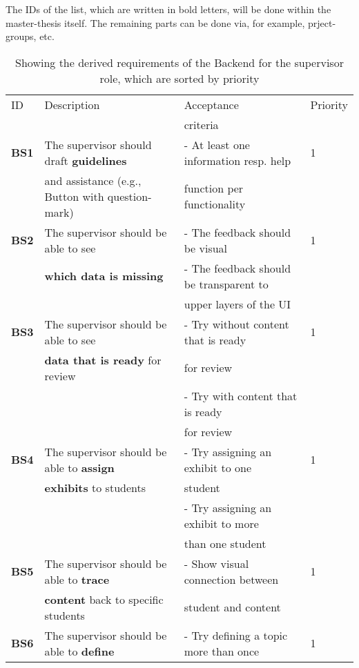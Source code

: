 \documentclass[twoside,openright,fleqn,pointlessnumbers,headinclude,,11pt,a4paper,BCOR5mm,footinclude,cleardoubleempty,abstracton %
                ]{scrreprt}
\begin{document}
The IDs of the list, which are written in bold letters, will be done within the master-thesis itself. The remaining parts can be done via, for example,
prject-groups, etc. 

	\begin{table}[h]
		\caption{Showing the derived requirements of the Backend for the supervisor role, which are sorted by priority}
	\begin{tabular}{llll}
	\hline
	ID 	& Description 	& Acceptance 	& Priority \\
	 	& 			 & criteria 	&  \\
		\hline
	\textbf{BS1} 	& The supervisor should draft \textbf{guidelines} 		& - At least one information resp. help 	& 1	\\
	 		& and assistance (e.g., Button with question-mark)		& function per functionality 			& 		\\
	\hline
	\textbf{BS2} 	& The supervisor should be able to see 				&  - The feedback should be visual	& 1	\\
	 	& \textbf{which data is missing} 					&  - The feedback should be transparent to	& 	\\
		& 											& upper layers of the UI & \\
	\hline
	\textbf{BS3} 	& The supervisor should be able to see 				& - Try without content that is ready & 1\\
	 	& \textbf{data that is ready} for review 				&  for review & \\
		&											& - Try with content that is ready		& \\
		&											& for review		& \\
	\hline
	\textbf{BS4} 	& The supervisor should be able to \textbf{assign} 	& - Try assigning an exhibit to one & 1\\
	 	& \textbf{exhibits} to students 					& student  & \\
		&										& - Try assigning an exhibit to more	& \\
		&										&	than one student				& \\
	\hline
	\textbf{BS5} 	& The supervisor should be able to \textbf{trace} 		& - Show visual connection between	& 1\\
	 	& \textbf{content} back to specific students 			&  student and content 	& \\
	\hline
	\textbf{BS6} 	& The supervisor should be able to \textbf{define}  	&  - Try defining a topic more than once	& 1\\

\end{tabular}
\end{table}
\end{document}
